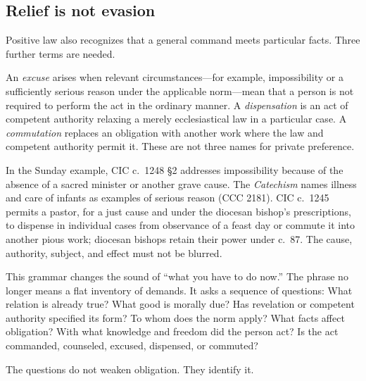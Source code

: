 \subsection{Relief is not evasion}

Positive law also recognizes that a general command meets particular facts. Three further terms are needed.

An \emph{excuse} arises when relevant circumstances---for example, impossibility or a sufficiently serious reason under the applicable norm---mean that a person is not required to perform the act in the ordinary manner. A \emph{dispensation} is an act of competent authority relaxing a merely ecclesiastical law in a particular case. A \emph{commutation} replaces an obligation with another work where the law and competent authority permit it. These are not three names for private preference.

In the Sunday example, CIC c.~1248 \S2 addresses impossibility because of the absence of a sacred minister or another grave cause. The \emph{Catechism} names illness and care of infants as examples of serious reason (CCC 2181). CIC c.~1245 permits a pastor, for a just cause and under the diocesan bishop's prescriptions, to dispense in individual cases from observance of a feast day or commute it into another pious work; diocesan bishops retain their power under c.~87. The cause, authority, subject, and effect must not be blurred.

This grammar changes the sound of ``what you have to do now.'' The phrase no longer means a flat inventory of demands. It asks a sequence of questions: What relation is already true? What good is morally due? Has revelation or competent authority specified its form? To whom does the norm apply? What facts affect obligation? With what knowledge and freedom did the person act? Is the act commanded, counseled, excused, dispensed, or commuted?

The questions do not weaken obligation. They identify it.
